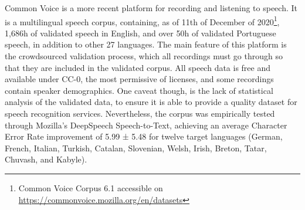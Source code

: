 Common Voice \cite{ardila2019common} is a more recent platform for recording and listening to speech. It is a multilingual speech corpus, containing, as of 11th of December of 2020\footnote{Common Voice Corpus 6.1 accessible on  \url{https://commonvoice.mozilla.org/en/datasets}}, 1,686h of validated speech in English, and over 50h of validated Portuguese speech, in addition to other 27 languages. The main feature of this platform is the crowdsourced validation process, which all recordings must go through so that they are included in the validated corpus. All speech data is free and available under CC-0, the most permissive of licenses, and some recordings contain speaker demographics. One caveat though, is the lack of statistical analysis of the validated data, to ensure it is able to provide a quality dataset for speech recognition services. Nevertheless, the corpus was empirically tested through Mozilla’s DeepSpeech Speech-to-Text, achieving an average Character Error Rate improvement of 5.99 ± 5.48 for twelve target languages (German, French, Italian, Turkish, Catalan, Slovenian, Welsh, Irish, Breton, Tatar, Chuvash, and Kabyle).